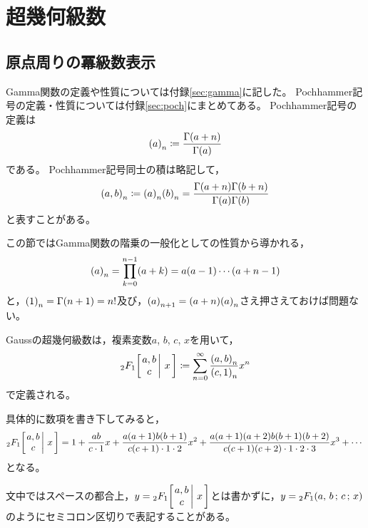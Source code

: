 \documentclass[a4paper,draft]{ltjsarticle}
\begin{document}
\section{超幾何級数}\label{sec:超幾何級数}
\subsection{原点周りの冪級数表示}
Gamma関数の定義や性質については付録\ref{sec:gamma}に記した。
Pochhammer記号の定義・性質については付録\ref{sec:poch}にまとめてある。
Pochhammer記号の定義は
\begin{equation}
    \poch{a}{n}\coloneqq \dfrac{\fun{\Gamma}{a+n}}{\fun{\Gamma}{a}}
\end{equation}
である。
Pochhammer記号同士の積は略記して，
\begin{equation}
    \poch{a,b}{n}\coloneqq \poch{a}{n}\poch{b}{n}=\dfrac{\fun{\Gamma}{a+n}\fun{\Gamma}{b+n}}{\fun{\Gamma}{a}\fun{\Gamma}{b}}
\end{equation}
と表すことがある。

この節ではGamma関数の階乗の一般化としての性質から導かれる，
\begin{equation}
    \poch{a}{n}=\prod_{k=0}^{n-1}\pare{a+k}=a\pare{a-1}\cdots\pare{a+n-1}
\end{equation}
と，$\poch{1}{n}=\fun{\Gamma}{n+1}=n!$及び，$\poch{a}{n+1}=\pare{a+n}\poch{a}{n}$さえ押さえておけば問題ない。

\begin{defi}[Gaussの超幾何関数]
    Gaussの超幾何級数は，複素変数$a$, $b$, $c$, $x$を用いて，
    \begin{equation}
        \Gauss{a}{b}{c}{x}\coloneqq \sum_{n=0}^\infty \dfrac{\poch{a,b}{n}}{\poch{c,1}{n}}x^n
        \label{eq:Gaussの超幾何級数-1-gauss-級数}
    \end{equation}
    で定義される。
\end{defi}

具体的に数項を書き下してみると，
\begin{equation}
    \Gauss{a}{b}{c}{x}
    = 1 + \dfrac{ab}{c\cdot 1}x + \dfrac{a\pare{a+1}b\pare{b+1}}{c\pare{c+1}\cdot 1 \cdot 2}x^2 + \dfrac{a\pare{a+1}\pare{a+2}b\pare{b+1}\pare{b+2}}{c\pare{c+1}\pare{c+2}\cdot 1\cdot 2 \cdot 3} x^3 + \cdots
\end{equation}
となる。

\begin{rem}
    文中ではスペースの都合上，$y=\Gauss{a}{b}{c}{x}$とは書かずに，$y=\sGauss{a}{b}{c}{x}$のようにセミコロン区切りで表記することがある。
\end{rem}
\end{document}
